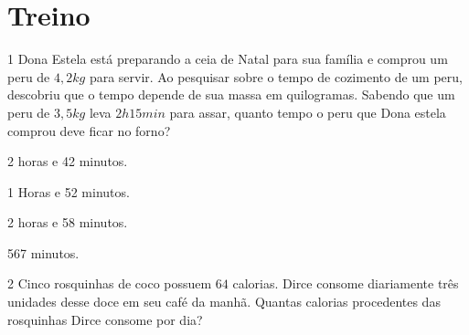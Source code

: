 \section*{Treino}

\num{1} Dona Estela está preparando a ceia de Natal para sua família e
comprou um peru de $4,2 kg$ para servir. Ao pesquisar sobre o tempo de
cozimento de um peru, descobriu que o tempo depende de sua massa em
quilogramas. Sabendo que um peru de $3,5 kg$ leva $2h 15min$ para assar,
quanto tempo o peru que Dona estela comprou deve ficar no forno?

\begin{multicols}{2}
\begin{escolha}[itemsep=0pt]
\item 2 horas e 42 minutos.
\item 1 Horas e 52 minutos.
\item 2 horas e 58 minutos.
\item 567 minutos.
\end{escolha}
\end{multicols}










\num{2} Cinco rosquinhas de coco possuem $64$ calorias. Dirce consome diariamente três
unidades desse doce em seu café da manhã. Quantas calorias procedentes
das rosquinhas Dirce consome por dia?

